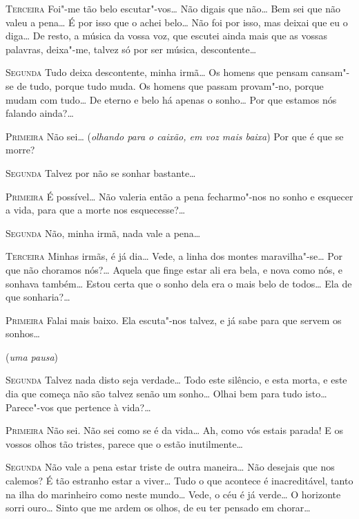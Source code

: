 \textsc{Terceira} Foi"-me tão belo escutar"-vos\ldots{} 
Não digais que não\ldots{} Bem
sei que não valeu a pena\ldots{}
É por isso que o achei belo\ldots{} Não foi por
isso, mas deixai que eu o diga\ldots{} 
De resto, a música da vossa voz, que
escutei ainda mais que as vossas palavras,
deixa"-me, talvez só por ser música, descontente\ldots{}

\textsc{Segunda} Tudo deixa descontente,
minha irmã\ldots{} Os homens que pensam
cansam"-se de tudo, porque tudo muda. Os homens que passam
provam"-no, porque mudam com tudo\ldots{} 
De eterno e belo há apenas o sonho\ldots{} 
Por que estamos nós falando ainda?\ldots{}

\textsc{Primeira} Não sei\ldots{} (\textit{olhando para o caixão,
em voz mais baixa}) Por que é que se morre? 

\textsc{Segunda} Talvez por não se sonhar bastante\ldots{}

\textsc{Primeira} É possível\ldots{} Não valeria então a 
pena fecharmo"-nos no
sonho e esquecer a vida, para que a morte nos esquecesse?\ldots{}

\textsc{Segunda} Não, minha irmã, nada vale a pena\ldots{}

\textsc{Terceira} Minhas irmãs, é já dia\ldots{} 
Vede, a linha dos montes
maravilha"-se\ldots{} Por que não
choramos nós?\ldots{} Aquela que finge estar
ali era bela, e nova como nós, e sonhava
também\ldots{} Estou certa que o
sonho dela era o mais belo de todos\ldots{} 
Ela de que sonharia?\ldots{}

\textsc{Primeira} Falai mais baixo. Ela escuta"-nos talvez,
e já sabe para que servem os sonhos\ldots{}

\hfill(\textit{uma pausa}) 

\textsc{Segunda} Talvez nada disto seja verdade\ldots{} 
Todo este silêncio, e esta
morta, e este dia que começa não são talvez 
senão um sonho\ldots{} Olhai bem
para tudo isto\ldots{} Parece"-vos que pertence à vida?\ldots{}

\textsc{Primeira} Não sei. Não sei como se é da vida\ldots{}
Ah, como vós estais parada! E os vossos olhos tão tristes,
parece que o estão inutilmente\ldots{}

\textsc{Segunda} Não vale a pena estar triste de outra
maneira\ldots{} Não desejais
que nos calemos? É tão estranho estar a
viver\ldots{} Tudo o que acontece é
inacreditável, tanto na ilha do marinheiro
como neste mundo\ldots{} Vede, o
céu é já verde\ldots{} O horizonte sorri
ouro\ldots{} Sinto que me ardem os
olhos, de eu ter pensado em chorar\ldots{}

